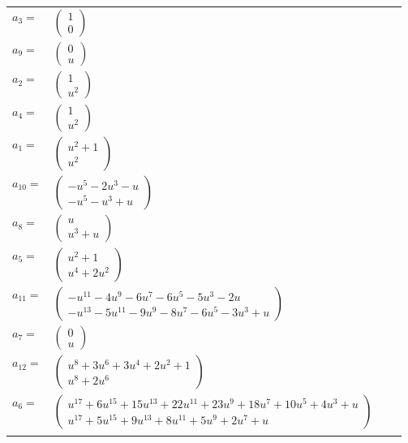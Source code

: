 \documentclass[1p]{elsarticle_modified}
\theoremstyle{definition}
\begin{document}
\begin{tabular}{m{7pt} m{180pt} m{7pt} m{180pt} }
\flushright $a_{3}=$&$\begin{pmatrix}1\\0\end{pmatrix}$ \\
\flushright $a_{9}=$&$\begin{pmatrix}0\\u\end{pmatrix}$ \\
\flushright $a_{2}=$&$\begin{pmatrix}1\\u^2\end{pmatrix}$ \\
\flushright $a_{4}=$&$\begin{pmatrix}1\\u^2\end{pmatrix}$ \\
\flushright $a_{1}=$&$\begin{pmatrix}u^2+1\\u^2\end{pmatrix}$ \\
\flushright $a_{10}=$&$\begin{pmatrix}- u^5-2 u^3- u\\- u^5- u^3+u\end{pmatrix}$ \\
\flushright $a_{8}=$&$\begin{pmatrix}u\\u^3+u\end{pmatrix}$ \\
\flushright $a_{5}=$&$\begin{pmatrix}u^2+1\\u^4+2 u^2\end{pmatrix}$ \\
\flushright $a_{11}=$&$\begin{pmatrix}- u^{11}-4 u^9-6 u^7-6 u^5-5 u^3-2 u\\- u^{13}-5 u^{11}-9 u^9-8 u^7-6 u^5-3 u^3+u\end{pmatrix}$ \\
\flushright $a_{7}=$&$\begin{pmatrix}0\\u\end{pmatrix}$ \\
\flushright $a_{12}=$&$\begin{pmatrix}u^8+3 u^6+3 u^4+2 u^2+1\\u^8+2 u^6\end{pmatrix}$ \\
\flushright $a_{6}=$&$\begin{pmatrix}u^{17}+6 u^{15}+15 u^{13}+22 u^{11}+23 u^9+18 u^7+10 u^5+4 u^3+u\\u^{17}+5 u^{15}+9 u^{13}+8 u^{11}+5 u^9+2 u^7+u\end{pmatrix}$\\&\end{tabular}
\end{document}
